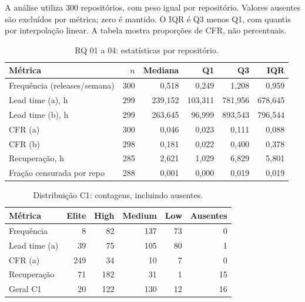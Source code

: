 
A análise utiliza 300 repositórios, com peso igual por repositório. Valores ausentes são excluídos por métrica; zero é mantido. O IQR é Q3 menos Q1, com quantis por interpolação linear. A tabela mostra proporções de CFR, não percentuais.

\begin{table}[ht]\centering\small

\caption{RQ 01 a 04: estatísticas por repositório.}\label{tab:rq0104-resumo}

\begin{tabular}{lrrrrr}\hline Métrica & $n$ & Mediana & Q1 & Q3 & IQR \\ \hline

Frequência (releases/semana) & 300 & 0,518 & 0,249 & 1,208 & 0,959 \\

Lead time (a), h & 299 & 239,152 & 103,311 & 781,956 & 678,645 \\

Lead time (b), h & 299 & 263,645 & 96,999 & 893,543 & 796,544 \\

CFR (a) & 300 & 0,046 & 0,023 & 0,111 & 0,088 \\

CFR (b) & 298 & 0,181 & 0,022 & 0,400 & 0,378 \\

Recuperação, h & 285 & 2,621 & 1,029 & 6,829 & 5,801 \\

Fração censurada por repo & 288 & 0,001 & 0,000 & 0,019 & 0,019 \\

\hline\end{tabular}\end{table}

\begin{table}[ht]\centering\small

\caption{Distribuição C1: contagens, incluindo ausentes.}\label{tab:rq0104-c1}

\begin{tabular}{lrrrrr}\hline Métrica & Elite & High & Medium & Low & Ausentes \\ \hline

Frequência & 8 & 82 & 137 & 73 & 0 \\

Lead time (a) & 39 & 75 & 105 & 80 & 1 \\

CFR (a) & 249 & 34 & 10 & 7 & 0 \\

Recuperação & 71 & 182 & 31 & 1 & 15 \\

Geral C1 & 20 & 122 & 130 & 12 & 16 \\

\hline\end{tabular}\end{table}


